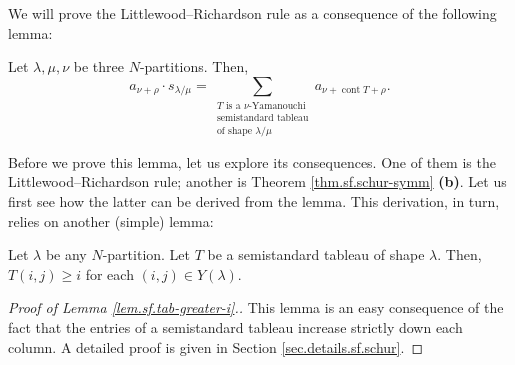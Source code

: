 We will prove the Littlewood--Richardson rule as a consequence of the
following lemma:

\begin{lemma}
\label{lem.sf.stemb-lem}Let $\lambda,\mu,\nu$ be three
$N$-partitions. Then,%
\[
a_{\nu+\rho}\cdot s_{\lambda/\mu}=\sum_{\substack{T\text{ is a }%
\nu\text{-Yamanouchi}\\\text{semistandard tableau}\\\text{of shape }%
\lambda/\mu}}a_{\nu+\operatorname*{cont}T+\rho}.
\]

\end{lemma}

Before we prove this lemma, let us explore its consequences. One of them is
the Littlewood--Richardson rule; another is Theorem \ref{thm.sf.schur-symm}
\textbf{(b)}. Let us first see how the latter can be derived from the lemma.
This derivation, in turn, relies on another (simple) lemma:

\begin{lemma}
\label{lem.sf.tab-greater-i}Let $\lambda$ be any $N$-partition. Let $T$ be a
semistandard tableau of shape $\lambda$. Then, $T\left(  i,j\right)  \geq i$
for each $\left(  i,j\right)  \in Y\left(  \lambda\right)  $.
\end{lemma}

\begin{proof}
[Proof of Lemma \ref{lem.sf.tab-greater-i}.]This lemma is an easy consequence
of the fact that the entries of a semistandard tableau increase strictly down
each column. A detailed proof is given in Section \ref{sec.details.sf.schur}.
\end{proof}

